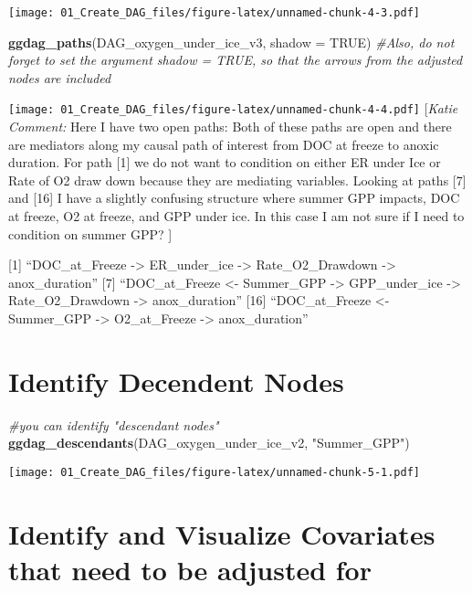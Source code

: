 \documentclass[]{article}
\newenvironment{Shaded}{\begin{snugshade}}{\end{snugshade}}
\newcommand{\CommentTok}[1]{\textcolor[rgb]{0.56,0.35,0.01}{\textit{#1}}}
\newcommand{\DataTypeTok}[1]{\textcolor[rgb]{0.13,0.29,0.53}{#1}}
\newcommand{\KeywordTok}[1]{\textcolor[rgb]{0.13,0.29,0.53}{\textbf{#1}}}
\newcommand{\NormalTok}[1]{#1}
\newcommand{\OtherTok}[1]{\textcolor[rgb]{0.56,0.35,0.01}{#1}}
\newcommand{\StringTok}[1]{\textcolor[rgb]{0.31,0.60,0.02}{#1}}
\begin{document}
\texttt{[image: 01\_Create\_DAG\_files/figure-latex/unnamed-chunk-4-3.pdf]}

\begin{Shaded}
\begin{Highlighting}[]
\KeywordTok{ggdag_paths}\NormalTok{(DAG_oxygen_under_ice_v3, }\DataTypeTok{shadow =} \OtherTok{TRUE}\NormalTok{) }\CommentTok{#Also, do not forget to set the argument shadow = TRUE, so that the arrows from the adjusted nodes are included}
\end{Highlighting}
\end{Shaded}

\texttt{[image: 01\_Create\_DAG\_files/figure-latex/unnamed-chunk-4-4.pdf]}
{ {[}\emph{Katie Comment:} Here I have two open paths: Both of these
paths are open and there are mediators along my causal path of interest
from DOC at freeze to anoxic duration. For path {[}1{]} we do not want
to condition on either ER under Ice or Rate of O2 draw down because they
are mediating variables. Looking at paths {[}7{]} and {[}16{]} I have a
slightly confusing structure where summer GPP impacts, DOC at freeze, O2
at freeze, and GPP under ice. In this case I am not sure if I need to
condition on summer GPP? {]} }

{[}1{]} ``DOC\_at\_Freeze -\textgreater{} ER\_under\_ice -\textgreater{}
Rate\_O2\_Drawdown -\textgreater{} anox\_duration'' {[}7{]}
``DOC\_at\_Freeze \textless{}- Summer\_GPP -\textgreater{}
GPP\_under\_ice -\textgreater{} Rate\_O2\_Drawdown -\textgreater{}
anox\_duration'' {[}16{]} ``DOC\_at\_Freeze \textless{}- Summer\_GPP
-\textgreater{} O2\_at\_Freeze -\textgreater{} anox\_duration''

\hypertarget{identify-decendent-nodes}{%
\section{Identify Decendent Nodes}\label{identify-decendent-nodes}}

\begin{Shaded}
\begin{Highlighting}[]
\CommentTok{#you can identify "descendant nodes" }
\KeywordTok{ggdag_descendants}\NormalTok{(DAG_oxygen_under_ice_v2, }\StringTok{"Summer_GPP"}\NormalTok{)}
\end{Highlighting}
\end{Shaded}

\texttt{[image: 01\_Create\_DAG\_files/figure-latex/unnamed-chunk-5-1.pdf]}

\hypertarget{identify-and-visualize-covariates-that-need-to-be-adjusted-for}{%
\section{Identify and Visualize Covariates that need to be adjusted
for}\label{identify-and-visualize-covariates-that-need-to-be-adjusted-for}}
\end{document}
